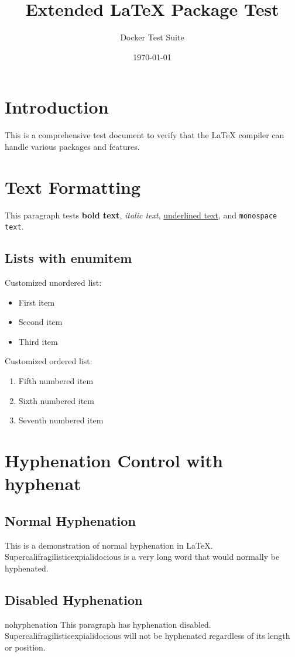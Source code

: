 \documentclass{article}
\title{\color{red}Extended LaTeX Package Test}
\author{Docker Test Suite}
\date{\today}
\begin{document}
    \maketitle

    \section{Introduction}
    This is a comprehensive test document to verify that the LaTeX compiler can handle various packages and features.

    \section{Text Formatting}
    This paragraph tests \textbf{bold text}, \textit{italic text}, \underline{underlined text}, and \texttt{monospace text}.

    \subsection{Lists with enumitem}
    Customized unordered list:
    \begin{itemize}[label=\color{blue}$\bullet$, leftmargin=*]
        \item First item
        \item Second item
        \item Third item
    \end{itemize}

    Customized ordered list:
    \begin{enumerate}[label=\color{red}\Roman*., start=5]
        \item Fifth numbered item
        \item Sixth numbered item
        \item Seventh numbered item
    \end{enumerate}

    \section{Hyphenation Control with hyphenat}
    \subsection{Normal Hyphenation}
    This is a demonstration of normal hyphenation in LaTeX. Supercalifragilisticexpialidocious is a very long word that would normally be hyphenated.

    \subsection{Disabled Hyphenation}
    \begin{hyphenrules}{nohyphenation}
        This paragraph has hyphenation disabled. Supercalifragilisticexpialidocious will not be hyphenated regardless of its length or position.
    \end{hyphenrules}
\end{document}
